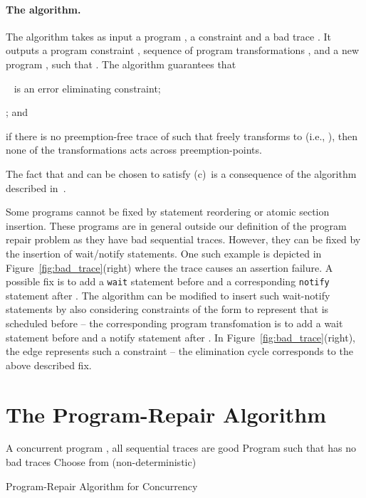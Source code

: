 \documentclass{llncs}
\begin{document}
\paragraph{The  algorithm.}
The  algorithm takes as input a program , a constraint
 and a bad trace .
It outputs a program constraint ,
sequence of program transformations , and
a new program , such that
.
The algorithm guarantees that
\begin{inparaenum}[(a)]
 \item~ is an error eliminating constraint;
 \item ; and
 \item if there is no preemption-free trace  of  such
   that  freely transforms to  (i.e., ), then none of the transformations  acts across preemption-points.
\end{inparaenum}
The fact that  and  can be chosen to
satisfy (c)~is a consequence of the algorithm described
in~\cite{cav2013}.

Some programs cannot be fixed by statement reordering or atomic section
insertion.
These programs are in general outside our definition of the program 
repair problem as they have bad sequential traces.
However, they can be fixed by the insertion of wait/notify
statements.
One such example is depicted in Figure~\ref{fig:bad_trace}(right) where the
trace  causes an assertion failure.
A possible fix is to add a {\tt wait} statement before  and a
corresponding {\tt notify} statement after .
The algorithm  can be modified to insert such wait-notify
statements by also considering constraints of the
form  to represent that  is scheduled before  -- the
corresponding program transfomation is to add a wait statement before
 and a notify statement after .
In Figure~\ref{fig:bad_trace}(right), the edge  represents such a
constraint  -- the elimination cycle  corresponds to the above described fix.

\section{The Program-Repair Algorithm}
\label{sec:algo}


\begin{algorithm}[tbh]
  \begin{algorithmic}[1]
    \REQUIRE A concurrent program , all sequential traces are good
    \ENSURE Program  such that  has no bad traces
    \STATE 
    \WHILE{\TRUE}
    \STATE{} \label{line:verify_prog}
    \STATE Choose  from  \hfill (non-deterministic) \label{line:pick_trace}
    \STATE 
    \ELSE
    \STATE \label{line:fix_bad}
    \STATE
     \label{line:adjust}
    \ENDIF
    \ENDWHILE
  \end{algorithmic}
  \caption{Program-Repair Algorithm for Concurrency}
  \label{algo:main}
\end{algorithm}
\end{document}
